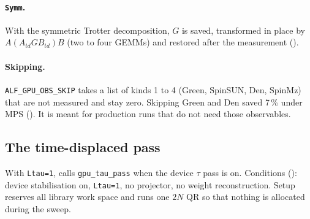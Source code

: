 \paragraph{\texttt{Symm}.} With the symmetric Trotter decomposition, $G$ is saved, transformed in place by $A(A_{td}GB_{td})B$ (two to four GEMMs) and restored after the measurement ().

\paragraph{Skipping.} \texttt{ALF\_GPU\_OBS\_SKIP} takes a list of kinds 1 to 4 (Green, SpinSUN, Den, SpinMz) that are not measured and stay zero. Skipping Green and Den saved 7\,\% under MPS (). %
It is meant for production runs that do not need those observables.


\subsection{The time-displaced pass}

With \texttt{Ltau=1},  calls \texttt{gpu\_tau\_pass} when the device $\tau$ pass is on. Conditions (): device stabilisation on, \texttt{Ltau=1}, no projector, no weight reconstruction. Setup reserves all library work space and runs one $2N$ QR so that nothing is allocated during the sweep.

